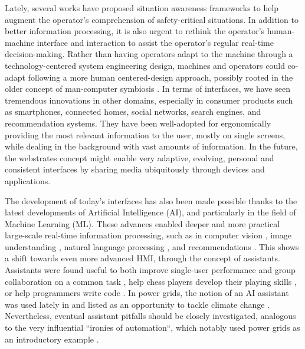 \documentclass{IOS-Book-Article}
\begin{document}

Lately, several works have proposed situation awareness frameworks \cite{naderpour2014intelligent,panteli2015situation,liu2016situational} to help augment the operator's comprehension of safety-critical situations. In addition to better information processing, it is also urgent to rethink the operator's human-machine interface \cite{naderpour2014intelligent} and interaction to assist the operator's regular real-time decision-making. Rather than having operators adapt to the machine through a technology-centered system engineering design, machines and operators could co-adapt \cite{mackay2000responding} following a more human centered-design \cite{boy2017human,shneiderman2022human} approach, possibly rooted in the older concept of man-computer symbiosis \cite{licklider1960man}.
In terms of interfaces,  we have seen tremendous innovations in other domains, especially in consumer products such as smartphones, connected homes, social networks, search engines, and recommendation systems. They have been well-adopted for ergonomically providing the most relevant information to the user, mostly on single screens, while dealing in the background with vast amounts of information. In the future, the webstrates \cite{klokmose2015webstrates} concept might enable very adaptive, evolving, personal and consistent interfaces by sharing media ubiquitously through devices and applications.

The development of today's interfaces has also been made possible thanks to the latest developments of Artificial Intelligence (AI), and particularly in the field of Machine Learning (ML). These advances enabled deeper and more practical large-scale real-time information processing, such as in computer vision \cite{russakovsky2015imagenet}, image understanding \cite{hossain2019comprehensive}, natural language processing \cite{brown2020language}, and recommendations \cite{zhang2019deep}.
This shows a shift towards even more advanced HMI, %
through the concept of assistants. Assistants were found useful to both improve single-user performance and group collaboration on a common task \cite{winkler2019alexa}, help chess players develop their playing skills \cite{mcilroyyoung2020maia}, or help programmers write code \cite{chen2021evaluating}. In power grids, the notion of an AI assistant was used lately  in \cite{donnot2017introducing,marot2018expert} and listed as an opportunity to tackle climate change \cite{clutton2021climate}. Nevertheless, eventual assistant pitfalls should be closely investigated, analogous to the very influential ``ironies of automation``, which notably used power grids as an introductory example \cite{bainbridge1983ironies}. 
\end{document}

